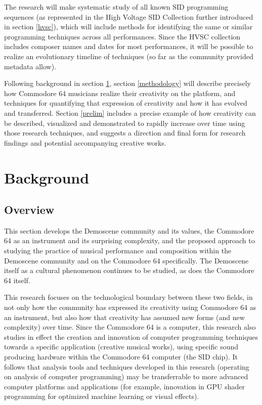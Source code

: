 \documentclass[10pt]{article}
\begin{document}
\begin{multicols*}{2}
The research will make systematic study of all known SID programming sequences (as represented in the High Voltage SID Collection\cite{hvsc} further introduced in section \ref{hvsc}), which will include methods for identifying the same or similar programming techniques across all performances. Since the HVSC collection includes composer names and dates for most performances, it will be possible to realize an evolutionary timeline of techniques (so far as the community provided metadata allow).

Following background in section \ref{background}, section \ref{methodology} will describe precisely how Commodore 64 musicians realize their creativity on the platform, and techniques for quantifying that expression of creativity and how it has evolved and transferred. Section \ref{prelim} includes a precise example of how creativity can be described, visualized and demonstrated to rapidly increase over time using those research techniques, and suggests a direction and final form for research findings and potential accompanying creative works.

  \section{Background}
  \label{background}

  \subsection{Overview}

This section develops the Demoscene community and its values, the Commodore 64 as an instrument and its surprising complexity, and the proposed approach to studying the practice of musical performance and composition within the Demoscene community and on the Commodore 64 specifically. The Demoscene itself as a cultural phenomenon continues to be studied, as does the Commodore 64 itself.

This research focuses on the technological boundary between these two fields, in not only how the community has expressed its creativity using Commodore 64 as an instrument, but also how that creativity has assumed new forms (and new complexity) over time. Since the Commodore 64 is a computer, this research also studies in effect the creation and innovation of computer programming techniques towards a specific application (creative musical works), using specific sound producing hardware within the Commodore 64 computer (the SID chip). It follows that analysis tools and techniques developed in this research (operating on analysis of computer programming) may be transferrable to more advanced computer platforms and applications (for example, innovation in GPU shader programming
for optimized machine learning or visual effects\cite{10.1145/3534540.3534688}).


\end{multicols*}
\end{document}
